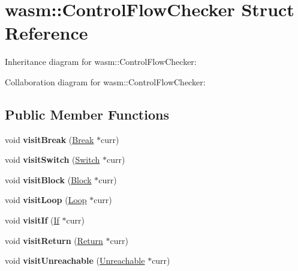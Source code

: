 \hypertarget{structwasm_1_1_control_flow_checker}{}\section{wasm\+:\+:Control\+Flow\+Checker Struct Reference}
\label{structwasm_1_1_control_flow_checker}


Inheritance diagram for wasm\+:\+:Control\+Flow\+Checker\+:


Collaboration diagram for wasm\+:\+:Control\+Flow\+Checker\+:
\subsection*{Public Member Functions}
\begin{DoxyCompactItemize}
\item 
\mbox{\label{structwasm_1_1_control_flow_checker_a96b9fd21e61a9e6478d7be114485cf99}} 
void {\bfseries visit\+Break} (\mbox{\hyperlink{classwasm_1_1_break}{Break}} $\ast$curr)
\item 
\mbox{\label{structwasm_1_1_control_flow_checker_aed9d1898b4d3486f78ffb43697a9fa61}} 
void {\bfseries visit\+Switch} (\mbox{\hyperlink{classwasm_1_1_switch}{Switch}} $\ast$curr)
\item 
\mbox{\label{structwasm_1_1_control_flow_checker_a16e3ee866bdaa54f1c7150366c36e056}} 
void {\bfseries visit\+Block} (\mbox{\hyperlink{classwasm_1_1_block}{Block}} $\ast$curr)
\item 
\mbox{\label{structwasm_1_1_control_flow_checker_aaf7ec37686d5e6d03cd4a4eca15e0797}} 
void {\bfseries visit\+Loop} (\mbox{\hyperlink{classwasm_1_1_loop}{Loop}} $\ast$curr)
\item 
\mbox{\label{structwasm_1_1_control_flow_checker_aaf4e30e1c6c62b9a2b8c83b46710efef}} 
void {\bfseries visit\+If} (\mbox{\hyperlink{classwasm_1_1_if}{If}} $\ast$curr)
\item 
\mbox{\label{structwasm_1_1_control_flow_checker_aff0ac8d2dcf695f49e189e7d768c135a}} 
void {\bfseries visit\+Return} (\mbox{\hyperlink{classwasm_1_1_return}{Return}} $\ast$curr)
\item 
\mbox{\label{structwasm_1_1_control_flow_checker_a44c565a60a715bf6b56172b9db1c6d66}} 
void {\bfseries visit\+Unreachable} (\mbox{\hyperlink{classwasm_1_1_unreachable}{Unreachable}} $\ast$curr)
\end{DoxyCompactItemize}

